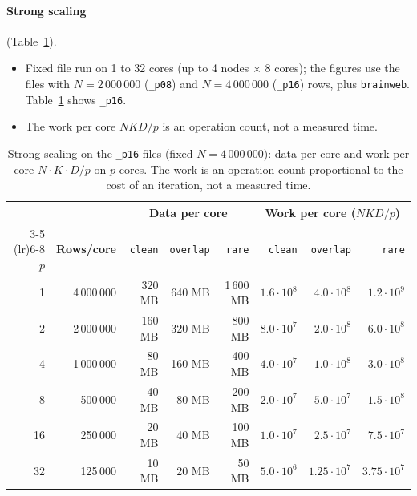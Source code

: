 \documentclass[conference,onecolumn]{IEEEtran}
\begin{document}
\paragraph{Strong scaling} (Table~\ref{tab:strong}).
\begin{itemize}
\item Fixed file run on 1 to 32 cores (up to 4 nodes $\times$ 8 cores); the figures use the files with $N=2\,000\,000$ (\texttt{\_p08}) and $N=4\,000\,000$ (\texttt{\_p16}) rows, plus \texttt{brainweb}. Table~\ref{tab:strong} shows \texttt{\_p16}.
\item The work per core $NKD/p$ is an operation count, not a measured time.
\end{itemize}

\begin{table}[H]
\centering
\caption{Strong scaling on the \texttt{\_p16} files (fixed $N = 4\,000\,000$): data per core and work per core $N \cdot K \cdot D / p$ on $p$ cores. The work is an operation count proportional to the cost of an iteration, not a measured time.}
\label{tab:strong}
\footnotesize
\setlength{\tabcolsep}{3pt}
\begin{tabular}{rrrrrrrr}
\toprule
 & & \multicolumn{3}{c}{\textbf{Data per core}} & \multicolumn{3}{c}{\textbf{Work per core ($N K D / p$)}} \\
\cmidrule(lr){3-5} \cmidrule(lr){6-8}
\textbf{$p$} & \textbf{Rows/core} & \texttt{clean} & \texttt{overlap} & \texttt{rare} & \texttt{clean} & \texttt{overlap} & \texttt{rare} \\
\midrule
1  & 4\,000\,000 & 320 MB & 640 MB & 1\,600 MB & $1.6 \cdot 10^8$ & $4.0 \cdot 10^8$ & $1.2 \cdot 10^9$ \\
2  & 2\,000\,000 & 160 MB & 320 MB & 800 MB    & $8.0 \cdot 10^7$ & $2.0 \cdot 10^8$ & $6.0 \cdot 10^8$ \\
4  & 1\,000\,000 & 80 MB  & 160 MB & 400 MB    & $4.0 \cdot 10^7$ & $1.0 \cdot 10^8$ & $3.0 \cdot 10^8$ \\
8  & 500\,000    & 40 MB  & 80 MB  & 200 MB    & $2.0 \cdot 10^7$ & $5.0 \cdot 10^7$ & $1.5 \cdot 10^8$ \\
16 & 250\,000    & 20 MB  & 40 MB  & 100 MB    & $1.0 \cdot 10^7$ & $2.5 \cdot 10^7$ & $7.5 \cdot 10^7$ \\
32 & 125\,000    & 10 MB  & 20 MB  & 50 MB     & $5.0 \cdot 10^6$ & $1.25 \cdot 10^7$ & $3.75 \cdot 10^7$ \\
\bottomrule
\end{tabular}
\end{table}
\end{document}
